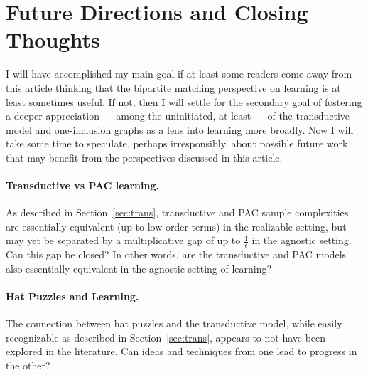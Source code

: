 \section{Future Directions and Closing Thoughts}
I will have accomplished my main goal if at least some readers come away from this article thinking that the bipartite matching perspective on learning is at least sometimes useful. If not, then I will settle for the secondary goal of fostering a deeper appreciation --- among the uninitiated, at least --- of the transductive model and one-inclusion graphs as a lens into learning more broadly. Now I will take some time to speculate, perhaps irresponsibly, about possible future work that may benefit from the perspectives discussed in this article. %




\paragraph{Transductive vs PAC learning.} As described in Section~\ref{sec:trans}, transductive and PAC sample complexities are essentially equivalent (up to low-order terms) in the realizable setting, but may yet be separated by a multiplicative gap of up to $\frac{1}{\epsilon}$ in the agnostic setting. Can this gap be closed? In other words, are the transductive and PAC models also essentially equivalent in the agnostic setting of learning? 

\paragraph{Hat Puzzles and Learning.} The connection between hat puzzles and the transductive model, while easily recognizable as described in Section~\ref{sec:trans}, appears to not have been explored in the literature. Can ideas and techniques from one lead to progress in the other? 

